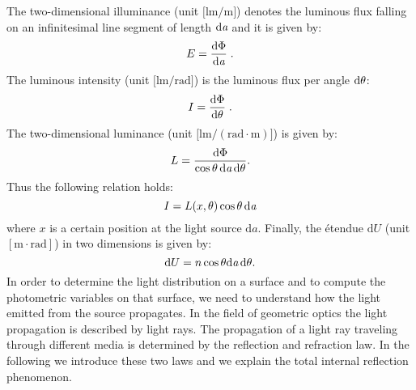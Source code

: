  The two-dimensional illuminance \big(unit $\big[\textrm{lm}/\textrm{m}\big]$\big) denotes the luminous flux falling on an infinitesimal line segment of length $\textrm{d}\textit{a}$ 
and it is given by:
 \begin{equation}
 E=\frac{\textrm{d}\Phi}{\textrm{d}\textit{a}}\;.
 \end{equation}
 The luminous intensity \big(unit $\big[\textrm{lm}/\textrm{rad}\big]$\big) is the luminous flux per angle $\textrm{d}\theta$:
 \begin{equation}
 I=\frac{\textrm{d}\Phi}{\textrm{d}\theta}\;.
 \end{equation}
 The two-dimensional luminance \big(unit $\big[\textrm{lm}/(\textrm{rad}\cdot \textrm{m})\big]$\big) is given by:
 \begin{equation}
 L= \frac{\textrm {d}\Phi}{\cos\theta\,\textrm{d}\textit{a} \,\textrm{d}\theta}.
 \end{equation}
 Thus the following relation holds:
 \begin{equation}
 I = L(x, \theta)\cos\theta\,\textrm{d}\textit{a}
 \end{equation}
where $x$ is a certain position at the light source $\textrm{d}a$.
 Finally, the \'{e}tendue $\textrm{d}U $ (unit $[\textrm{m}\cdot \textrm{rad}]$) in two dimensions is given by:
\begin{equation}\label{etendue2d}
\textrm{d}U = n\cos\theta\textrm{d}\textit{a}\,\textrm{d}\theta.
\end{equation}
In order to determine the light distribution on a surface and to compute the photometric variables on that surface, we need to understand how the light emitted from the source propagates. In the field of geometric optics the light propagation is described by light rays.
The propagation of a light ray traveling through  different media is determined by the reflection and refraction law.
In the following we introduce these two laws and we explain the total internal reflection phenomenon.
